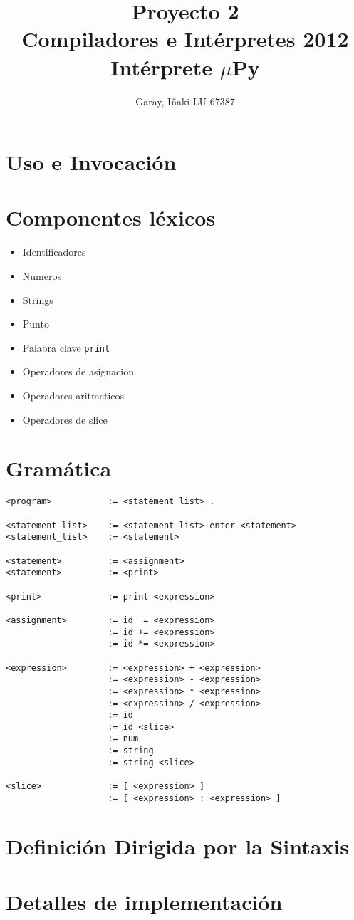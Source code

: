 \documentclass [a4paper,titlepage]{report}
\title{Proyecto 2\\Compiladores e Intérpretes 2012\\Intérprete $\mu$Py}
\author{Garay, I\~{n}aki LU 67387}
\begin{document}
\maketitle

\tableofcontents

\newpage

\section{Uso e Invocación}

\section{Componentes léxicos}

\begin{itemize}
\item Identificadores
\item Numeros
\item Strings
\item Punto
\item Palabra clave \texttt{print}
\item Operadores de asignacion
\item Operadores aritmeticos
\item Operadores de slice
\end{itemize}

\section{Gramática}

\begin{verbatim}
<program>           := <statement_list> .

<statement_list>    := <statement_list> enter <statement>
<statement_list>    := <statement>

<statement>         := <assignment>
<statement>         := <print>

<print>             := print <expression>

<assignment>        := id  = <expression>
                    := id += <expression>
                    := id *= <expression>

<expression>        := <expression> + <expression>
                    := <expression> - <expression>
                    := <expression> * <expression>
                    := <expression> / <expression>
                    := id
                    := id <slice>
                    := num
                    := string
                    := string <slice>

<slice>             := [ <expression> ]
                    := [ <expression> : <expression> ]
\end{verbatim}

\section{Definición Dirigida por la Sintaxis}

\section{Detalles de implementación}
\end{document}

